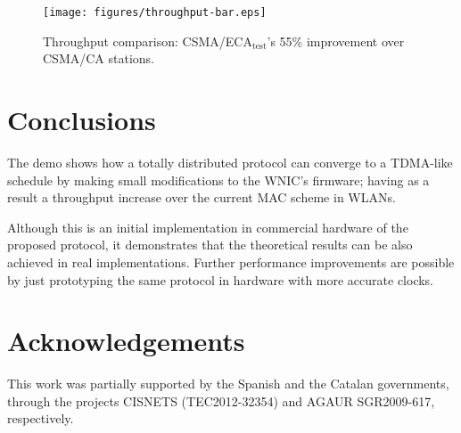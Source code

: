 \documentclass[conference]{IEEEtran}
\begin{document}
	
	\begin{figure}[htbp]
		\centering
		\texttt{[image: figures/throughput-bar.eps]}
		\caption{Throughput comparison: CSMA/ECA$_{\text{test}}$'s 55\% improvement over CSMA/CA stations.}
		\label{fig:throughput}
	\end{figure}

\section{Conclusions}
The demo shows how a totally distributed protocol can converge to a TDMA-like schedule by making small modifications to the WNIC's firmware; having as a result a throughput increase over the current MAC scheme in WLANs.

Although this is an initial implementation in commercial hardware of the proposed protocol, it demonstrates that the theoretical results can be also achieved in real implementations. Further performance improvements are possible by just prototyping the same protocol in hardware with more accurate clocks.

\section{Acknowledgements}
This work was partially supported by the Spanish and the Catalan governments, through the projects CISNETS (TEC2012-32354) and AGAUR SGR2009-617, respectively.



\end{document}
